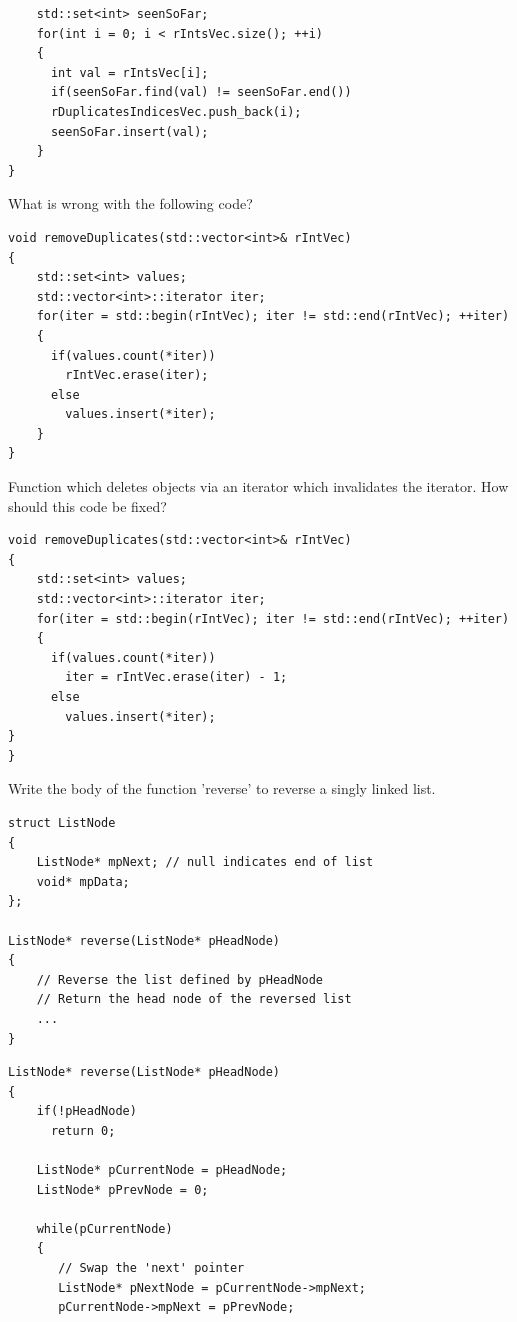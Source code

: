 \documentclass{exam}%
\begin{document}
\begin{questions}
\begin{solution}[.2in]
\begin{lstlisting}
    std::set<int> seenSoFar;
    for(int i = 0; i < rIntsVec.size(); ++i)
    {
      int val = rIntsVec[i];
      if(seenSoFar.find(val) != seenSoFar.end())
      rDuplicatesIndicesVec.push_back(i);
      seenSoFar.insert(val);
    }
}
\end{lstlisting}
\end{solution}

\question What is wrong with the following code?
\begin{lstlisting}
void removeDuplicates(std::vector<int>& rIntVec)
{
    std::set<int> values;
    std::vector<int>::iterator iter;
    for(iter = std::begin(rIntVec); iter != std::end(rIntVec); ++iter)
    {
      if(values.count(*iter))
        rIntVec.erase(iter);
      else
        values.insert(*iter);
    }
}
\end{lstlisting}
\begin{solution}[.2in]
Function which deletes objects via an iterator which invalidates the iterator. How should this code be fixed?
\begin{lstlisting}
void removeDuplicates(std::vector<int>& rIntVec)
{
    std::set<int> values;
    std::vector<int>::iterator iter;
    for(iter = std::begin(rIntVec); iter != std::end(rIntVec); ++iter)
    {
      if(values.count(*iter))
        iter = rIntVec.erase(iter) - 1;
      else
        values.insert(*iter);
}
}
\end{lstlisting}
\end{solution}

\question Write the body of the function 'reverse' to reverse a singly linked list.
\begin{lstlisting}
struct ListNode
{
    ListNode* mpNext; // null indicates end of list
    void* mpData;
};

ListNode* reverse(ListNode* pHeadNode)
{
    // Reverse the list defined by pHeadNode
    // Return the head node of the reversed list
    ...
}
\end{lstlisting}
\begin{solution}[.2in]
\begin{lstlisting}
ListNode* reverse(ListNode* pHeadNode)
{
    if(!pHeadNode)
      return 0;

    ListNode* pCurrentNode = pHeadNode;
    ListNode* pPrevNode = 0;

    while(pCurrentNode)
    {
       // Swap the 'next' pointer
       ListNode* pNextNode = pCurrentNode->mpNext;
       pCurrentNode->mpNext = pPrevNode;


\end{lstlisting}
\end{solution}
\end{questions}
\end{document}

